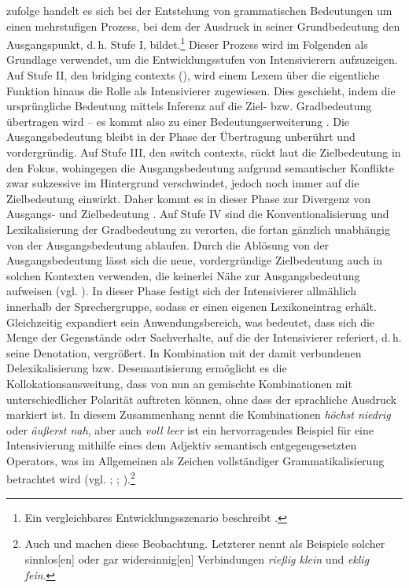 
\citet[85f.]{Heine.2002b} zufolge handelt es sich bei der Entstehung von grammatischen Bedeutungen um einen mehrstufigen Prozess, bei dem der Ausdruck in seiner Grundbedeutung den Ausgangspunkt, d.\,h. Stufe I, bildet.\footnote{Ein vergleichbares Entwicklungsszenario beschreibt \citet[187ff.]{Kirschbaum.2002b}.} Dieser Prozess wird im Folgenden als Grundlage verwendet, um die Entwicklungsstufen von Intensivierern aufzuzeigen. Auf Stufe II, den \glqq{}bridging contexts\grqq{} (\citealt[5]{Evans.1998}), wird einem Lexem über die eigentliche Funktion hinaus die Rolle als Intensivierer zugewiesen. Dies geschieht, indem die ursprüngliche Bedeutung mittels Inferenz auf die Ziel- bzw. Gradbedeutung übertragen wird -- es kommt also zu einer Bedeutungserweiterung {\citep[vgl.][83]{Paul.1880}}. Die Ausgangsbedeutung bleibt in der Phase der Übertragung unberührt und vordergründig. Auf Stufe III, den \glqq{}switch contexts\grqq{}, rückt laut \citet[86]{Heine.2002b} die Zielbedeutung in den Fokus, wohingegen die Ausgangsbedeutung aufgrund semantischer Konflikte zwar sukzessive im Hintergrund verschwindet, jedoch noch immer auf die Zielbedeutung einwirkt. Daher kommt es in dieser Phase zur Divergenz von Ausgangs- und Zielbedeutung \citep[vgl.][86]{Heine.2002b}. Auf {Stufe IV} sind die Konventionalisierung und Lexikalisierung der Gradbedeutung zu verorten, die fortan gänzlich unabhängig von der Ausgangsbedeutung ablaufen. Durch die Ablösung von der Ausgangsbedeutung lässt sich die neue, vordergründige Zielbedeutung auch in solchen Kontexten verwenden, die keinerlei Nähe zur Ausgangsbedeutung aufweisen (vgl. \citealt[86]{Heine.2002b}). In dieser Phase festigt sich der Intensivierer allmählich innerhalb der Sprechergruppe, sodass er einen eigenen Lexikoneintrag erhält. Gleichzeitig expandiert sein Anwendungsbereich, was bedeutet, dass sich die Menge der Gegenstände oder Sachverhalte, auf die der Intensivierer referiert, d.\,h. seine Denotation, vergrößert. In Kombination mit der damit verbundenen Delexikalisierung bzw. Desemantisierung ermöglicht es die Kollokationsausweitung, dass von nun an gemischte Kombinationen mit unterschiedlicher Polarität auftreten können, ohne dass der sprachliche Ausdruck markiert ist. In diesem Zusammenhang nennt {\citet[400]{Breindl.2007}} die Kombinationen \textit{höchst niedrig} oder \textit{äußerst nah}, aber auch \textit{voll leer} ist ein hervorragendes Beispiel für eine Intensivierung mithilfe eines dem Adjektiv semantisch entgegengesetzten Operators, was im Allgemeinen als Zeichen vollständiger Grammatikalisierung betrachtet wird (vgl. {\citealt[61]{Tobler.1868}}; {\citealt[118]{Biedermann.1969}}; \citealt[194f.]{Kirschbaum.2002b}).\footnote{Auch \citet[7]{Hauschild.1899} und \citet[268]{Becher.1907} machen diese Beobachtung. Letzterer nennt als Beispiele solcher \glqq{}sinnlos[en] oder gar widersinnig[en]\grqq{} Verbindungen \textit{rießig klein} und \textit{eklig fein}.}

